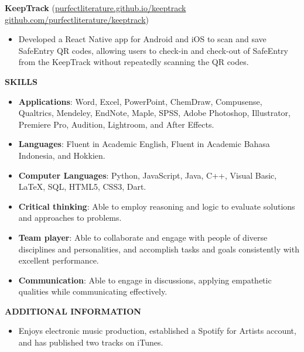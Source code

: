 \documentclass[a4paper, 11pt]{article}
\newcommand{\interspace}{\vspace{10pt}}
\newcommand{\intraspace}{\vspace{5pt}}
\begin{document}
	\intraspace
	
	\textbf{KeepTrack} (\href{https://purfectliterature.github.io/keeptrack/}{purfectliterature.github.io/keeptrack} \textbar\space \href{https://github.com/purfectliterature/keeptrack}{github.com/purfectliterature/keeptrack})
	\begin{itemize}[leftmargin=*, noitemsep, topsep=0pt]
		\item Developed a React Native app for Android and iOS to scan and save SafeEntry QR codes, allowing users to check-in and check-out of SafeEntry from the KeepTrack without repeatedly scanning the QR codes.
	\end{itemize}

	\interspace
	
	\textbf{\large SKILLS} \hrulefill
	\begin{itemize}[leftmargin=*, noitemsep, topsep=0pt]
		\item \textbf{Applications}: Word, Excel, PowerPoint, ChemDraw, Compusense, Qualtrics, Mendeley, EndNote, Maple, SPSS, Adobe Photoshop, Illustrator, Premiere Pro, Audition, Lightroom, and After Effects.
		\item \textbf{Languages}: Fluent in Academic English, Fluent in Academic Bahasa Indonesia, and Hokkien.
		\item \textbf{Computer Languages}: Python, JavaScript, Java, C++, Visual Basic, \LaTeX, SQL, HTML5, CSS3, Dart.
		
		\intraspace
		
		\item \textbf{Critical thinking}: Able to employ reasoning and logic to evaluate solutions and approaches to problems.
		\item \textbf{Team player}: Able to collaborate and engage with people of diverse disciplines and personalities, and accomplish tasks and goals consistently with excellent performance.
		\item \textbf{Communication}: Able to engage in discussions, applying empathetic qualities while communicating effectively.
	\end{itemize}

	\interspace
	
	\textbf{\large ADDITIONAL INFORMATION} \hrulefill
	\begin{itemize}[leftmargin=*, noitemsep, topsep=0pt]
		\item Enjoys electronic music production, established a Spotify for Artists account, and has published two tracks on iTunes.
	\end{itemize}
\end{document}
